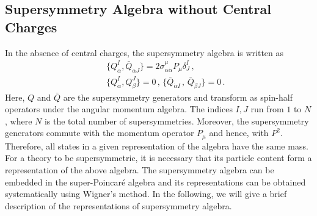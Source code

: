 \subsection{Supersymmetry Algebra without Central Charges}

In the absence of central charges, the supersymmetry algebra is
written as  
\begin{eqnarray}
&&\{ Q^{I}_{\alpha}, \bar{Q}_{\dot{\alpha} J} \} = 2
\sigma^\mu_{\alpha \dot{\alpha}} P_\mu \delta^{I}_{J}\,, 
\nonumber\\
&&\{Q^I_\alpha , Q^J_\beta\}=0\,,\,\{{\bar Q}_{\dot\alpha I}\,,\, 
{\bar Q}_{\dot\beta J}\}=0\,.
\label{susy-noC}
\end{eqnarray}
Here, $Q$ and $\bar Q$ are the supersymmetry generators and transform
as spin-half operators under the  angular momentum algebra. The
indices $I, J$ run from $1$ to $N$, where $N$ is the total number of
supersymmetries. Moreover, the supersymmetry generators commute with
the momentum operator $P_\mu$ and hence, with $P^2$. Therefore, all
states in a given representation of the algebra have the same mass.  
For a theory to be supersymmetric, it is necessary that its particle
content form a representation of the above algebra. The supersymmetry
algebra can be embedded in the super-Poincar\'{e} algebra and its
representations can be obtained systematically using Wigner's
method. In the following, we will give a brief description of the
representations of supersymmetry algebra. 

